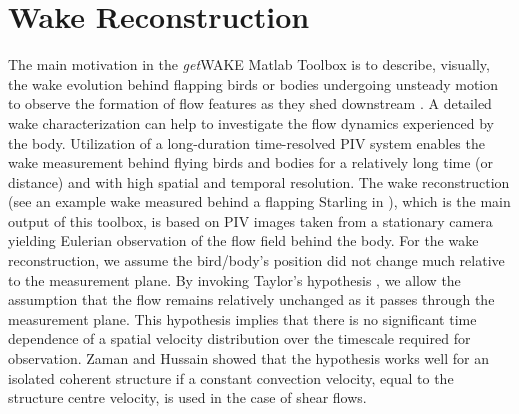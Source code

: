 \documentclass[12pt,a4paper]{article}
\begin{document}
\section{Wake Reconstruction}
The main motivation in the \textit{get}WAKE Matlab Toolbox is to describe, visually, the wake evolution behind flapping birds or bodies undergoing unsteady motion to observe the formation of flow features as they shed downstream \cite{Ben-Gida2013,Nafi2020,Stalnov2015,Gurka2017,Lawley2019}. 
A detailed wake characterization can help to investigate the flow dynamics experienced by the body. 
Utilization of a long-duration time-resolved PIV system enables the wake measurement behind flying birds and bodies for a relatively long time (or distance) and with high spatial and temporal resolution. 
The wake reconstruction (see an example wake measured behind a flapping Starling in ), which is the main output of this toolbox, is based on PIV images taken from a stationary camera yielding Eulerian observation of the flow field behind the body. 
For the wake reconstruction, we assume the bird/body's position did not change much relative to the measurement plane. 
By invoking Taylor's hypothesis \cite{Taylor1938}, we allow the assumption that the flow remains relatively unchanged as it passes through the measurement plane. This hypothesis implies that there is no significant time dependence of a spatial velocity distribution over the timescale required for observation. 
Zaman and Hussain \cite{Zaman1981} showed that the hypothesis works well for an isolated coherent structure if a constant convection velocity, equal to the structure centre velocity, is used in the case of shear flows.
\end{document}
